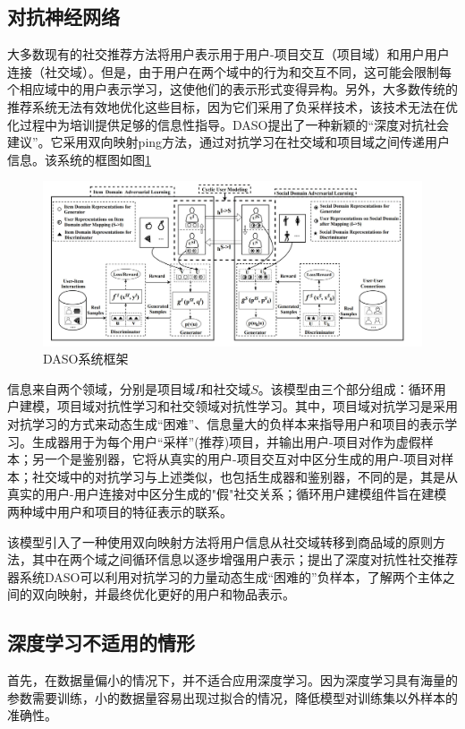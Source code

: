 \subsection{对抗神经网络}
大多数现有的社交推荐方法将用户表示用于用户-项目交互（项目域）和用户用户连接（社交域）。但是，由于用户在两个域中的行为和交互不同，这可能会限制每个相应域中的用户表示学习，这使他们的表示形式变得异构。另外，大多数传统的推荐系统无法有效地优化这些目标，因为它们采用了负采样技术，该技术无法在优化过程中为培训提供足够的信息性指导。DASO\cite{fan2019deep}提出了一种新颖的“深度对抗社会建议”。它采用双向映射ping方法，通过对抗学习在社交域和项目域之间传递用户信息。该系统的框图如图\ref{fig4}

\begin{figure}
    \includegraphics[width=0.9\linewidth]{dpfig/fig4.JPG}
    \caption{DASO系统框架}
    \label{fig4}
\end{figure} 

信息来自两个领域，分别是项目域$I$和社交域$S$。该模型由三个部分组成：循环用户建模，项目域对抗性学习和社交领域对抗性学习。其中，项目域对抗学习是采用对抗学习的方式来动态生成“困难”、信息量大的负样本来指导用户和项目的表示学习。生成器用于为每个用户“采样”(推荐)项目，并输出用户-项目对作为虚假样本；另一个是鉴别器，它将从真实的用户-项目交互对中区分生成的用户-项目对样本；社交域中的对抗学习与上述类似，也包括生成器和鉴别器，不同的是，其是从真实的用户-用户连接对中区分生成的"假"社交关系；循环用户建模组件旨在建模两种域中用户和项目的特征表示的联系。

该模型引入了一种使用双向映射方法将用户信息从社交域转移到商品域的原则方法，其中在两个域之间循环信息以逐步增强用户表示；提出了深度对抗性社交推荐器系统DASO可以利用对抗学习的力量动态生成“困难的”负样本，了解两个主体之间的双向映射，并最终优化更好的用户和物品表示。

\subsection{深度学习不适用的情形}

首先，在数据量偏小的情况下，并不适合应用深度学习。因为深度学习具有海量的参数需要训练，小的数据量容易出现过拟合的情况，降低模型对训练集以外样本的准确性。

